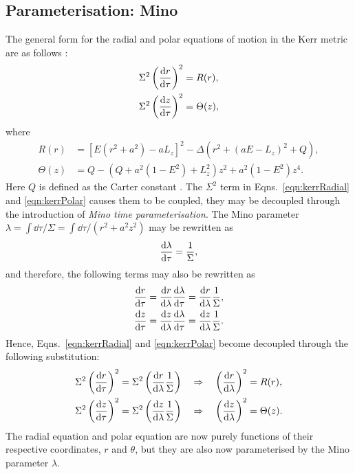 
\subsection{Parameterisation: Mino}
The general form for the radial and polar equations of motion in the Kerr metric are as follows \cite{resoFujita}:
\begin{align}
    \Sigma^2\left(\dv{r}{\tau}\right)^2&=R(r),\label{eqn:kerrRadial}\\
    \Sigma^2\left(\dv{z}{\tau}\right)^2&=\Theta(z),\label{eqn:kerrPolar}
\end{align}
where
\begin{align}
    R(r)&=[E(r^2+a^2)-aL_z]^2-\Delta(r^2+(aE-L_z)^2+Q),\\
    \Theta(z)&=Q-(Q+a^2(1-E^2)+L^2_z)z^2+a^2(1-E^2)z^4.
\end{align}
Here $Q$ is defined as the Carter constant \cite{carterDefinition}.
The $\Sigma^2$ term in Eqns.~\eqref{eqn:kerrRadial} and \eqref{eqn:kerrPolar} causes them to be coupled, they may be decoupled through the introduction of \textit{Mino time parameterisation}.
The Mino parameter $\lambda=\int \dd{\tau}/\Sigma=\int \dd{\tau}/(r^2+a^2z^2)$ may be rewritten as
\begin{equation}
\dv{\lambda}{\tau}=\frac{1}{\Sigma},
\end{equation}
and therefore, the following terms may also be rewritten as
\begin{align}
\dv{r}{\tau}&=\dv{r}{\lambda}\dv{\lambda}{\tau}=\dv{r}{\lambda}\frac{1}{\Sigma},\\
\dv{z}{\tau}&=\dv{z}{\lambda}\dv{\lambda}{\tau}=\dv{z}{\lambda}\frac{1}{\Sigma}.
\end{align}
Hence, Eqns.~\eqref{eqn:kerrRadial} and \eqref{eqn:kerrPolar} become decoupled through the following substitution:
\begin{align}
    \Sigma^2\left(\dv{r}{\tau}\right)^2&=\Sigma^2\left(\dv{r}{\lambda}\frac{1}{\Sigma} \right)\quad \Rightarrow \quad \left(\dv{r}{\lambda} \right)^2=R(r),\\
    \Sigma^2\left(\dv{z}{\tau}\right)^2&=\Sigma^2\left(\dv{z}{\lambda}\frac{1}{\Sigma} \right)\quad \Rightarrow \quad\left(\dv{z}{\lambda} \right)^2=\Theta(z).
\end{align}
The radial equation and polar equation are now purely functions of their respective coordinates, $r$ and $\theta$, but they are also now parameterised by the Mino parameter $\lambda$.

